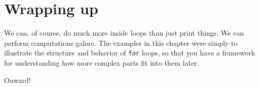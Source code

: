 \section{Wrapping up}

We can, of course, do much more inside loops than just print things. We can
perform computations galore. The examples in this chapter were simply to
illustrate the structure and behavior of \texttt{for} loops, so that you have a
framework for understanding how more complex parts fit into them later.

Onward!
